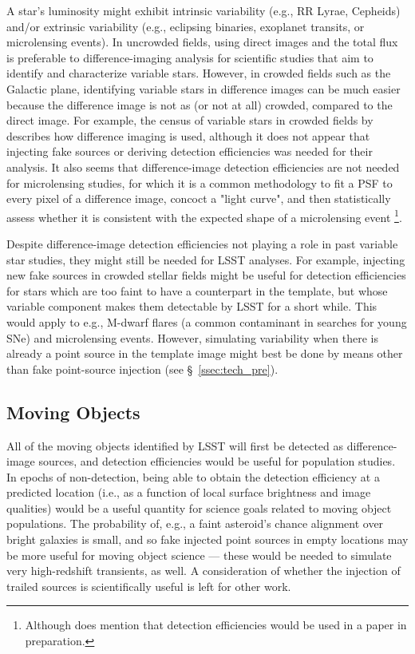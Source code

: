 \documentclass[DM,lsstdraft,toc]{lsstdoc}
\begin{document}
A star's luminosity might exhibit intrinsic variability (e.g., RR Lyrae, Cepheids) and/or extrinsic variability (e.g., eclipsing binaries, exoplanet transits, or microlensing events). In uncrowded fields, using direct images and the total flux is preferable to difference-imaging analysis for scientific studies that aim to identify and characterize variable stars. However, in crowded fields such as the Galactic plane, identifying variable stars in difference images can be much easier because the difference image is not as (or not at all) crowded, compared to the direct image. For example, the census of variable stars in crowded fields by \cite{2016A&A...588A.128F} describes how difference imaging is used, although it does not appear that injecting fake sources or deriving detection efficiencies was needed for their analysis. It also seems that difference-image detection efficiencies are not needed for microlensing studies, for which it is a common methodology to fit a PSF to every pixel of a difference image, concoct a "light curve", and then statistically assess whether it is consistent with the expected shape of a microlensing event \cite{2015ApJ...806..161L}\footnote{Although \cite{2015ApJ...806..161L} does mention that detection efficiencies would be used in a paper in preparation.}. 

Despite difference-image detection efficiencies not playing a role in past variable star studies, they might still be needed for LSST analyses. For example, injecting new fake sources in crowded stellar fields might be useful for detection efficiencies for stars which are too faint to have a counterpart in the template, but whose variable component makes them detectable by LSST for a short while. This would apply to e.g., M-dwarf flares (a common contaminant in searches for young SNe) and microlensing events. However, simulating variability when there is already a point source in the template image might best be done by means other than fake point-source injection (see \S~\ref{ssec:tech_pre}).

\subsection{Moving Objects}\label{ssec:sci_move}

All of the moving objects identified by LSST will first be detected as difference-image sources, and detection efficiencies would be useful for population studies. In epochs of non-detection, being able to obtain the detection efficiency at a predicted location (i.e., as a function of local surface brightness and image qualities) would be a useful quantity for science goals related to moving object populations. The probability of, e.g., a faint asteroid's chance alignment over bright galaxies is small, and so fake injected point sources in empty locations may be more useful for moving object science --- these would be needed to simulate very high-redshift transients, as well. A consideration of whether the injection of trailed sources is scientifically useful is left for other work.
\end{document}
